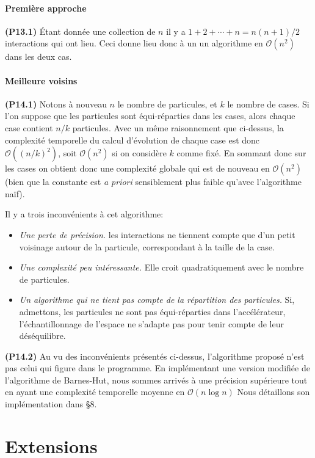 \documentclass[12pt, letterpaper, twoside]{article}
\def\O{\mathcal{O}}
\begin{document}
\subsection{Première approche}
\noindent \textbf{(P13.1)} Étant donnée une collection de $n$ il y a $1+2+\cdots+n = n(n+1)/2$ interactions qui ont lieu. Ceci donne lieu donc à un un algorithme en $\O(n^2)$ dans les deux cas.

\subsection{Meilleure voisins}
\noindent \textbf{(P14.1)} Notons à nouveau $n$ le nombre de particules, et $k$ le nombre de cases. Si l'on suppose que les particules sont équi-réparties dans les cases, alors chaque case contient $n/k$ particules. Avec un même raisonnement que ci-dessus, la complexité temporelle du calcul d'évolution de chaque case est donc $\O((n/k)^2)$, soit $\O(n^2)$ si on considère $k$ comme fixé. En sommant donc sur les cases on obtient donc une complexité globale qui est de nouveau en $\O(n^2)$ (bien que la constante est \textit{a priori} sensiblement plus faible qu'avec l'algorithme naïf).

Il y a trois inconvénients à cet algorithme:
\begin{itemize}
	\item \textit{Une perte de précision.} les interactions ne tiennent compte que d'un petit voisinage autour de la particule, correspondant à la taille de la case.
	\item \textit{Une complexité peu intéressante.} Elle croit quadratiquement avec le nombre de particules.
	\item \textit{Un algorithme qui ne tient pas compte de la répartition des particules.} Si, admettons, les particules ne sont pas équi-réparties dans l'accélérateur, l'échantillonnage de l'espace ne s'adapte pas pour tenir compte de leur déséquilibre.
\end{itemize}

\noindent \textbf{(P14.2)} Au vu des inconvénients présentés ci-dessus, l'algorithme proposé n'est pas celui qui figure dans le programme. En implémentant une version modifiée de l'algorithme de Barnes-Hut, nous sommes arrivés à une précision supérieure tout en ayant une complexité temporelle moyenne en $\O(n \log n)$ Nous détaillons son implémentation dans \S 8.

\newpage

\part*{Extensions}
\end{document}
